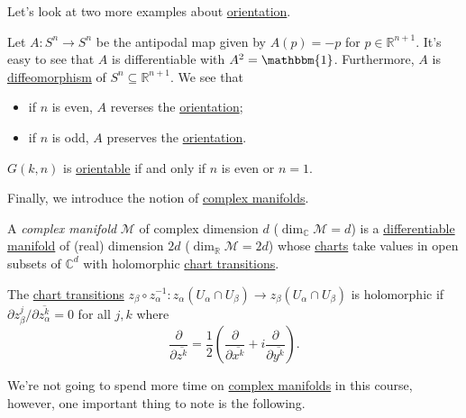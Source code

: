 Let's look at two more examples about \hyperref[def:orientation]{orientation}.

\begin{eg}
	Let \(A\colon S^n \to S^n\) be the antipodal map given by \(A(p) = -p\) for \(p\in \mathbb{R} ^{n+1}\). It's easy to see that \(A\) is differentiable with \(A^2 = \mathbbm{1} \). Furthermore, \(A\) is \hyperref[def:diffeomorphism]{diffeomorphism} of \(S^n \subseteq \mathbb{R} ^{n+1}\). We see that
	\begin{itemize}
		\item if \(n\) is even, \(A\) reverses the \hyperref[def:orientation]{orientation};
		\item if \(n\) is odd, \(A\) preserves the \hyperref[def:orientation]{orientation}.
	\end{itemize}
\end{eg}

\begin{eg}
	\(G(k, n)\) is \hyperref[def:orientation]{orientable} if and only if \(n\) is even or \(n=1\).
\end{eg}

Finally, we introduce the notion of \hyperref[def:complex-manifold]{complex manifolds}.

\begin{definition}\label{def:complex-manifold}
	A \emph{complex manifold} \(\mathcal{M} \) of complex dimension \(d\) (\(\dim _{\mathbb{C} }\mathcal{M} = d\)) is a \hyperref[def:smooth-manifold]{differentiable manifold} of (real) dimension \(2d\) (\(\dim _\mathbb{R} \mathcal{M} =2d\)) whose \hyperref[def:coordinate-chart]{charts} take values in open subsets of \(\mathbb{C} ^d\) with holomorphic \hyperref[def:coordinate-transition]{chart transitions}.
\end{definition}

\begin{prev}
	The \hyperref[def:coordinate-transition]{chart transitions} \(z_\beta \circ z_\alpha ^{-1} \colon z_\alpha (U_\alpha \cap U_\beta ) \to z_\beta (U_\alpha \cap U_\beta )\) is holomorphic if \(\partial z_\beta ^j / \partial \overline{z_\alpha ^k} = 0\) for all \(j, k\) where
	\[
		\frac{\partial }{\partial \overline{z^k}} = \frac{1}{2} \left( \frac{\partial }{\partial \overline{x^k}} + i \frac{\partial }{\partial \overline{y^k}} \right).
	\]
\end{prev}

We're not going to spend more time on \hyperref[def:complex-manifold]{complex manifolds} in this course, however, one important thing to note is the following.

